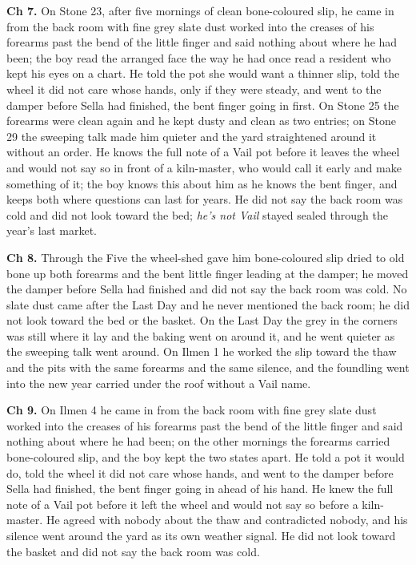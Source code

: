 \documentclass{design/chronicle}
\begin{document}
{\textbf{Ch 7.} On Stone 23, after five mornings of clean bone-coloured slip, he came in from the back room with fine grey slate dust worked into the creases of his forearms past the bend of the little finger and said nothing about where he had been; the boy read the arranged face the way he had once read a resident who kept his eyes on a chart. He told the pot she would want a thinner slip, told the wheel it did not care whose hands, only if they were steady, and went to the damper before Sella had finished, the bent finger going in first. On Stone 25 the forearms were clean again and he kept dusty and clean as two entries; on Stone 29 the sweeping talk made him quieter and the yard straightened around it without an order. He knows the full note of a Vail pot before it leaves the wheel and would not say so in front of a kiln-master, who would call it early and make something of it; the boy knows this about him as he knows the bent finger, and keeps both where questions can last for years. He did not say the back room was cold and did not look toward the bed; \emph{he’s not Vail} stayed sealed through the year’s last market.

\textbf{Ch 8.} Through the Five the wheel-shed gave him bone-coloured slip dried to old bone up both forearms and the bent little finger leading at the damper; he moved the damper before Sella had finished and did not say the back room was cold. No slate dust came after the Last Day and he never mentioned the back room; he did not look toward the bed or the basket. On the Last Day the grey in the corners was still where it lay and the baking went on around it, and he went quieter as the sweeping talk went around. On Ilmen 1 he worked the slip toward the thaw and the pits with the same forearms and the same silence, and the foundling went into the new year carried under the roof without a Vail name.

\textbf{Ch 9.} On Ilmen 4 he came in from the back room with fine grey slate dust worked into the creases of his forearms past the bend of the little finger and said nothing about where he had been; on the other mornings the forearms carried bone-coloured slip, and the boy kept the two states apart. He told a pot it would do, told the wheel it did not care whose hands, and went to the damper before Sella had finished, the bent finger going in ahead of his hand. He knew the full note of a Vail pot before it left the wheel and would not say so before a kiln-master. He agreed with nobody about the thaw and contradicted nobody, and his silence went around the yard as its own weather signal. He did not look toward the basket and did not say the back room was cold.

}
\end{document}
